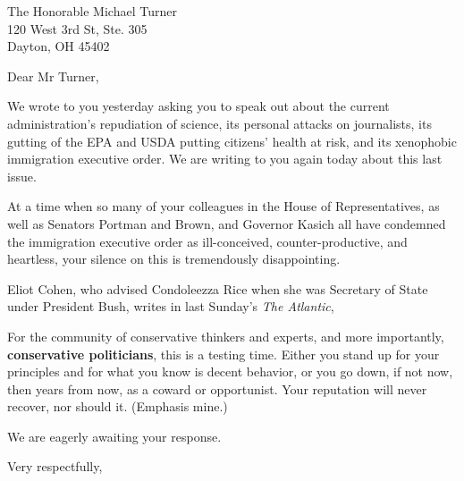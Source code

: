 \documentclass{letter}
\begin{document}
\begin{letter}{
  The Honorable Michael Turner \\
  120 West 3rd St, Ste. 305 \\
  Dayton, OH 45402}

\opening{Dear Mr Turner,}

We wrote to you yesterday asking you to speak out about the current administration's repudiation of science, its personal attacks on journalists, its gutting of the EPA and USDA putting citizens' health at risk, and its xenophobic immigration executive order. We are writing to you again today about this last issue.

At a time when so many of your colleagues in the House of Representatives, as well as Senators Portman and Brown, and Governor Kasich all have condemned the immigration executive order as ill-conceived, counter-productive, and heartless, your silence on this is tremendously disappointing.

Eliot Cohen, who advised Condoleezza Rice when she was Secretary of State under President Bush, writes in last Sunday's {\it The Atlantic},

\begin{displayquote}
For the community of conservative thinkers and experts, and more importantly, {\bf conservative politicians}, this is a testing time. Either you stand up for your principles and for what you know is decent behavior, or you go down, if not now, then years from now, as a coward or opportunist. Your reputation will never recover, nor should it. (Emphasis mine.)
\end{displayquote}

We are eagerly awaiting your response.

\closing{Very respectfully,}


\end{letter}
\end{document}
